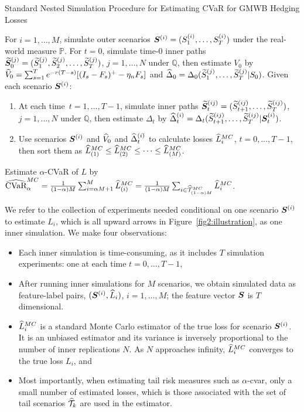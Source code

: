 \begin{algorithm} 
\caption{Standard Nested Simulation Procedure for Estimating CVaR for GMWB Hedging Losses}
\begin{algorithmic}[1] \label{alg2:standardProcedure}
    \STATE  For $i=1,\ldots,M$, simulate outer scenarios $\bm{S}^{(i)} = (S_{1}^{(i)},\ldots,S_{T}^{(i)})$ under the real-world measure $\mathbb{P}$.
    \STATE  For $t=0$, simulate time-$0$ inner paths $\widetilde{\bm{S}}_{0}^{(j)} = (\widetilde{S}_{1}^{(j)},\widetilde{S}_{2}^{(j)},\ldots,\widetilde{S}_{T}^{(j)})$, $j=1,\ldots,N$ under $\mathbb{Q}$, then estimate $V_0$ by $\widehat{V}_0 = \sum_{s=1}^{T} e^{-r(T-s)} [(I_s - F_s)^+- \eta_n F_s]$ and $\widehat{\Delta}_0 = \Delta_0(\widetilde{S}_{1}^{(j)},\ldots,\widetilde{S}_{T}^{(j)} | S_0)$.
    \STATE  Given each scenario $\bm{S}^{(i)}$:
    \begin{enumerate}[label=\alph*., itemsep=0pt, parsep=0pt, topsep=0pt]
        \item   At each time~$t=1,\ldots,T-1$, simulate inner paths $\widetilde{\bm{S}}_{t}^{(ij)} = (\widetilde{S}_{t+1}^{(ij)},\ldots,\widetilde{S}_{T}^{(ij)})$, $j=1,\ldots,N$ under $\mathbb{Q}$, then estimate $\Delta_t$ by $\widehat{\Delta}_t^{(i)} = \Delta_t(\widetilde{S}_{t+1}^{(ij)},\ldots,\widetilde{S}_{T}^{(ij)} | \bm{S}_t^{(i)})$.
        \item   Use scenarios $\bm{S}^{(i)}$ and $\widehat{V}_0$ and $\widehat{\Delta}_t^{(i)}$ to calculate losses $\widehat{L}_i^{MC}$, $t=0,\ldots,T-1$, then sort them as $\widehat{L}^{MC}_{(1)}\leq \widehat{L}^{MC}_{(2)} \leq \cdots\leq \widehat{L}^{MC}_{(M)}$.
    \end{enumerate}
    \STATE  Estimate $\alpha$-CVaR of $L$ by $\widehat{\mbox{CVaR}}^{MC}_\alpha = \frac{1}{(1-\alpha)M} \sum_{i=\alpha M + 1}^{M}\widehat{L}_{(i)}^{MC} = \frac{1}{(1-\alpha)M} \sum_{i \in \widehat{\mathcal{T}}_{(1-\alpha )M}^{MC}}\widehat{L}_{i}^{MC}$.
\end{algorithmic}
\end{algorithm}

We refer to the collection of experiments needed conditional on one scenario $\bm{S}^{(i)}$ to estimate $L_i$, which is all upward arrows in Figure~\ref{fig2:illustration}, as one inner simulation.
We make four observations:
\begin{itemize}
    \item   Each inner simulation is time-consuming, as it includes $T$ simulation experiments: one at each time $t=0,\ldots,T-1$,
    \item   After running inner simulations for $M$ scenarios, we obtain simulated data as feature-label pairs, $(\bm{S}^{(i)}, \widehat{L}_i)$, $i=1,\ldots,M$; the feature vector $\bm{S}$ is $T$ dimensional.
    \item   $\widehat{L}_i^{MC}$ is a standard Monte Carlo estimator of the true loss for scenario $\bm{S}^{(i)}$. 
    It is an unbiased estimator and its variance is inversely proportional to the number of inner replications $N$. 
    As $N$ approaches infinity, $\widehat{L}_i^{MC}$ converges to the true loss $L_i$, and
    \item   Most importantly, when estimating tail risk measures such as $\alpha$-\gls{cvar}, only a small number of estimated losses, which is those associated with the set of tail scenarios $\widehat{\mathcal{T}}_{k}$ are used in the estimator.
\end{itemize}

